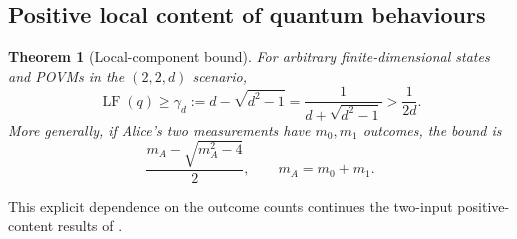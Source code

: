 \documentclass[11pt]{amsart}
\newtheorem{theorem}{Theorem}[section]
\theoremstyle{remark}
\theoremstyle{plain}
\numberwithin{equation}{section}
\DeclareMathOperator{\LF}{LF}
\begin{document}
\subsection{Positive local content of quantum behaviours}

\begin{theorem}[Local-component bound]\label{thm:LF}
For arbitrary finite-dimensional states and POVMs in the
\((2,2,d)\) scenario,
\begin{equation}\label{eq:gamma}
 \LF(q)\ge\gamma_d:=d-\sqrt{d^2-1}
 =\frac1{d+\sqrt{d^2-1}}>\frac1{2d}.
\end{equation}
More generally, if Alice's two measurements have \(m_0,m_1\) outcomes,
the bound is
\[
 \frac{m_A-\sqrt{m_A^2-4}}2,\qquad m_A=m_0+m_1.
\]
\end{theorem}

This explicit dependence on the outcome counts continues the
two-input positive-content results of \cite{GMS,Joshi}.
\end{document}
